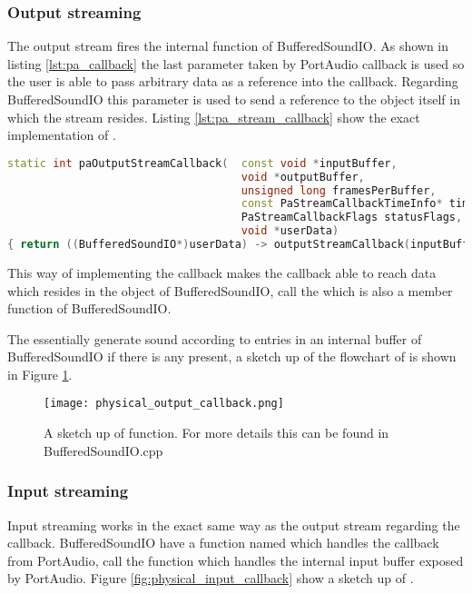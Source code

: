 		\subsubsection{Output streaming}
		The output stream fires the internal  function of BufferedSoundIO. As shown in listing \ref{lst:pa_callback}
		the last parameter taken by PortAudio callback  is used so the user is able to pass arbitrary data as a reference into the
		callback. Regarding BufferedSoundIO this parameter is used to send a reference to the object itself in which the stream resides. 
		Listing \ref{lst:pa_stream_callback} show the exact implementation of .
		
		\begin{lstlisting}[float=htb,language={C++},caption={Implementation of \smalltt{paOutputStreamCallback}},label={lst:pa_stream_callback}]
static int paOutputStreamCallback(	const void *inputBuffer,
									void *outputBuffer,
									unsigned long framesPerBuffer,
									const PaStreamCallbackTimeInfo* timeInfo,
									PaStreamCallbackFlags statusFlags,
									void *userData)
{ return ((BufferedSoundIO*)userData) -> outputStreamCallback(inputBuffer, outputBuffer, framesPerBuffer, timeInfo, statusFlags); }
		\end{lstlisting}
		
		This way of implementing the callback makes the callback able to reach data which resides in the object of BufferedSoundIO,
		 call the  which is also a member function of BufferedSoundIO.
		
		The  essentially generate sound according to entries in an internal buffer of BufferedSoundIO
		if there is any present, a sketch up of the flowchart of  is shown in Figure \ref{fig:physical_output_callback}.
		
		\begin{figure}[htb]
			\begin{center}
			\texttt{[image: physical\_output\_callback.png]}%
			\caption{A sketch up of  function. For more details this can be found in BufferedSoundIO.cpp}
			\label{fig:physical_output_callback}
			\end{center}
		\end{figure}
		
		\subsubsection{Input streaming}
		Input streaming works in the exact same way as the output stream regarding the callback. BufferedSoundIO have a function named
		 which handles the callback from PortAudio,  call the 
		function which handles the internal input buffer exposed by PortAudio. Figure \ref{fig:physical_input_callback} show a sketch up of .
		
